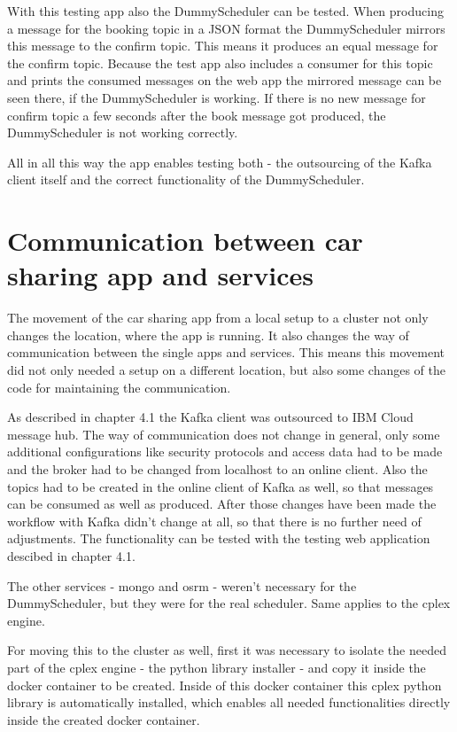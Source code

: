 With this testing app also the DummyScheduler can be tested. When producing a message for the booking topic in a JSON format the DummyScheduler mirrors this message to the confirm topic. This means it produces an equal message for the confirm topic. Because the test app also includes a consumer for this topic and prints the consumed messages on the web app the mirrored message can be seen there, if the DummyScheduler is working. If there is no new message for confirm topic a few seconds after the book message got produced, the DummyScheduler is not working correctly.

All in all this way the app enables testing both - the outsourcing of the Kafka client itself and the correct functionality of the DummyScheduler.

\section{Communication between car sharing app and services}

The movement of the car sharing app from a local setup to a cluster not only changes the location, where the app is running. It also changes the way of communication between the single apps and services. This means this movement did not only needed a setup on a different location, but also some changes of the code for maintaining the communication. 

As described in chapter 4.1 the Kafka client was outsourced to IBM Cloud message hub. The way of communication does not change in general, only some additional configurations like security protocols and access data had to be made and the broker had to be changed from localhost to an online client. Also the topics had to be created in the online client of Kafka as well, so that messages can be consumed as well as produced. After those changes have been made the workflow with Kafka didn't change at all, so that there is no further need of adjustments. The functionality can be tested with the testing web application descibed in chapter 4.1.

The other services - mongo and osrm - weren't necessary for the DummyScheduler, but they were for the real scheduler. Same applies to the cplex engine.

For moving this to the cluster as well, first it was necessary to isolate the needed part of the cplex engine - the python library installer - and copy it inside the docker container to be created. Inside of this docker container this cplex python library is automatically installed, which enables all needed functionalities directly inside the created docker container.

